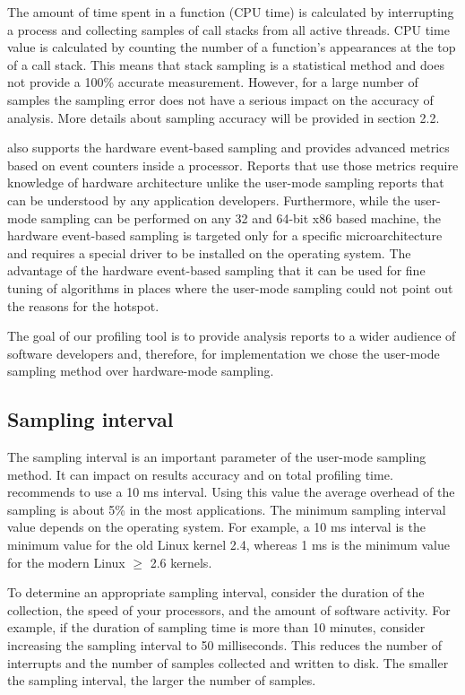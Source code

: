 \documentclass[a4paper]{jpconf}
\begin{document}
The amount of time spent in a function (CPU time) is calculated by interrupting a process and collecting samples of 
call stacks from all active threads. CPU time value is calculated by counting the number of  a function's appearances at 
the top of a call stack. This means that stack sampling is a statistical method and does not provide a 100\% accurate 
measurement. However, for a large number of samples the sampling error does not have a serious impact on the accuracy of 
analysis. More details about sampling accuracy will be provided in section 2.2.

\amp also supports the hardware event-based sampling and provides advanced metrics based on event counters inside 
a processor. Reports that use those metrics require  knowledge of hardware architecture  unlike the user-mode 
sampling reports that can be understood by any application developers. Furthermore, while the user-mode sampling can 
be performed on any 32 and 64-bit x86 based machine, the hardware event-based sampling is targeted only for a specific 
\intel microarchitecture and requires a special driver to be installed on the operating system. The advantage of 
the hardware event-based sampling that it can be used for fine tuning of algorithms in places where  the user-mode 
sampling could not point out the reasons for the hotspot.

The goal of our profiling tool is to provide analysis reports to a wider audience of software developers and, therefore, 
for implementation we chose the user-mode sampling method over hardware-mode sampling.

\subsection{Sampling interval}

The sampling interval is an important parameter of the user-mode sampling method. It can impact on results accuracy and 
on total profiling time. \intel recommends to use a 10 ms interval. Using this value the average overhead of the sampling 
is about 5\% in the most applications. The minimum sampling interval value depends on the operating system. For example, a 10 ms interval 
is the minimum value for the old Linux kernel 2.4, whereas 1 ms is the minimum value for the modern Linux $\ge$ 2.6 kernels.

To determine an appropriate sampling interval, consider the duration of the collection, the speed of your processors, 
and the amount of software activity. For example, if the duration of sampling time is more than 10 minutes, 
consider increasing the sampling interval to 50 milliseconds. This reduces the number of interrupts and 
the number of samples collected and written to disk. The smaller the sampling interval, the larger the number of samples.
\end{document}
